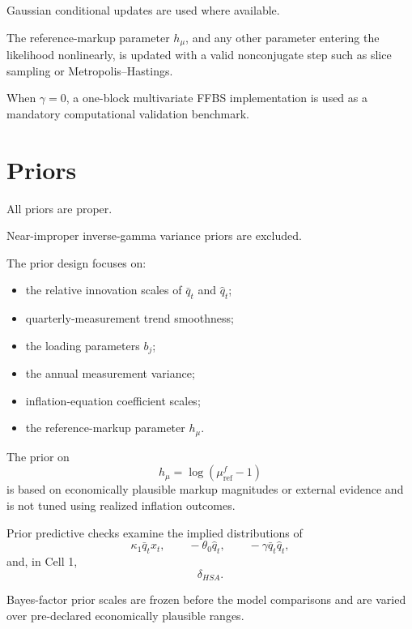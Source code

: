 \documentclass[11pt]{article}
\begin{document}
Gaussian conditional updates are used where available.

The reference-markup parameter \(h_\mu\), and any other parameter entering the likelihood nonlinearly, is updated with a valid nonconjugate step such as slice sampling or Metropolis--Hastings.

When \(\gamma=0\), a one-block multivariate FFBS implementation is used as a mandatory computational validation benchmark.

\section{Priors}

All priors are proper.

Near-improper inverse-gamma variance priors are excluded.

The prior design focuses on:
\begin{itemize}
\item the relative innovation scales of \(\bar q_t\) and \(\hat q_t\);
\item quarterly-measurement trend smoothness;
\item the loading parameters \(b_j\);
\item the annual measurement variance;
\item inflation-equation coefficient scales;
\item the reference-markup parameter \(h_\mu\).
\end{itemize}

The prior on
\begin{equation}
h_\mu=\log(\mu_{\mathrm{ref}}^f-1)
\end{equation}
is based on economically plausible markup magnitudes or external evidence and is not tuned using realized inflation outcomes.

Prior predictive checks examine the implied distributions of
\begin{equation}
\kappa_1\bar q_tx_t,
\qquad
-\theta_0\hat q_t,
\qquad
-\gamma\bar q_t\hat q_t,
\end{equation}
and, in Cell 1,
\begin{equation}
\delta_{HSA}.
\end{equation}

Bayes-factor prior scales are frozen before the model comparisons and are varied over pre-declared economically plausible ranges.
\end{document}
